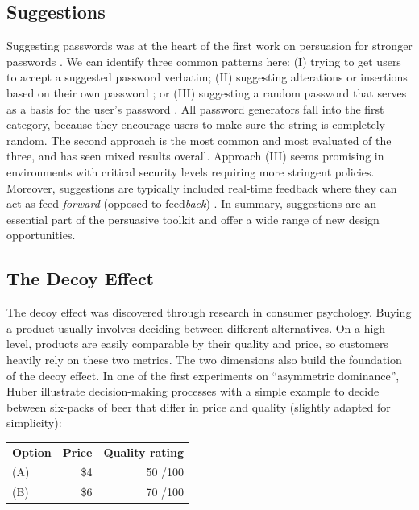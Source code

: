 \subsection{Suggestions}
Suggesting passwords was at the heart of the first work on persuasion for stronger passwords \cite{Forget2008ImprovingPasswordsThroughPersuasion}. We can identify three common patterns here: (I) trying to get users to accept a suggested password verbatim\cite{Vance2013FearAppeals}; (II) suggesting alterations or insertions based on their own password \cite{Forget2008ImprovingPasswordsThroughPersuasion,Segreti2017AdaptivePolicies, Shay2015SpoonfulOfSugar}; or (III) suggesting a random password that serves as a basis for the user's password \cite{Huha2015UserReplaceablePasswords}. All password generators fall into the first category, because they encourage users to make sure the string is completely random. The second approach is the most common and most evaluated of the three, and has seen mixed results overall. Approach (III) seems promising in environments with critical security levels requiring more stringent policies. Moreover, suggestions are typically included real-time feedback where they can act as feed-\textit{forward} (opposed to feed\textit{back}) \cite{Ur2017DataDrivenPWMeter}. In summary, suggestions are an essential part of the persuasive toolkit and offer a wide range of new design opportunities.

\subsection{The Decoy Effect}
The decoy effect was discovered through research in consumer psychology. Buying a product usually involves deciding between different alternatives. On a high level, products are easily comparable by their quality and price, so customers heavily rely on these two metrics. The two dimensions also build the foundation of the decoy effect. In one of the first experiments on ``asymmetric dominance'', Huber \etal illustrate decision-making processes with a simple example to decide between six-packs of beer that differ in price and quality \cite{Huber1982AsymetricallyDominated} (slightly adapted for simplicity): 
\begin{table}[!h]
\begin{tabular}{lrr}
	\textbf{Option} & \textbf{Price} & \textbf{Quality rating}\\
	(A) & \$4 & 50 \small{/100}\\
	(B) & \$6 & 70 \small{/100}\\
\end{tabular}
\end{table}

